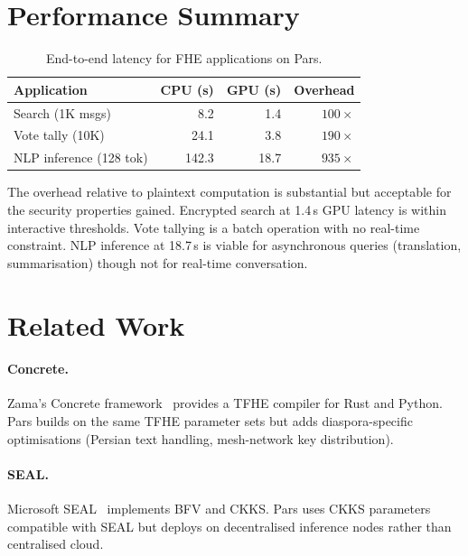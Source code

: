 \documentclass[11pt,a4paper]{article}
\begin{document}
\section{Performance Summary}
\label{sec:performance}

\begin{table}[h]
\centering
\caption{End-to-end latency for FHE applications on Pars.}
\label{tab:e2e}
\begin{tabular}{@{}lrrr@{}}
\toprule
\textbf{Application} & \textbf{CPU (s)} & \textbf{GPU (s)} & \textbf{Overhead} \\
\midrule
Search (1K msgs)      & 8.2   & 1.4   & $100\times$ \\
Vote tally (10K)      & 24.1  & 3.8   & $190\times$ \\
NLP inference (128 tok) & 142.3 & 18.7  & $935\times$ \\
\bottomrule
\end{tabular}
\end{table}

The overhead relative to plaintext computation is substantial but
acceptable for the security properties gained.  Encrypted search at
1.4\,s GPU latency is within interactive thresholds.  Vote tallying is a
batch operation with no real-time constraint.  NLP inference at 18.7\,s
is viable for asynchronous queries (translation, summarisation) though
not for real-time conversation.

\section{Related Work}
\label{sec:related}

\paragraph{Concrete.}  Zama's Concrete framework~\cite{zama2022concrete}
provides a TFHE compiler for Rust and Python.  Pars builds on the same
TFHE parameter sets but adds diaspora-specific optimisations (Persian
text handling, mesh-network key distribution).

\paragraph{SEAL.}  Microsoft SEAL~\cite{seal2022} implements BFV and CKKS.
Pars uses CKKS parameters compatible with SEAL but deploys on
decentralised inference nodes rather than centralised cloud.
\end{document}
